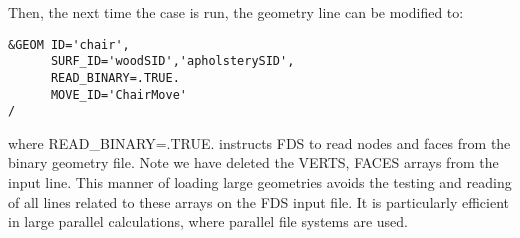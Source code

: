 \documentclass[12pt]{article}
\begin{document}
Then, the next time the case is run, the geometry line can be modified to:
{\small
\begin{verbatim}
&GEOM ID='chair',
      SURF_ID='woodSID','apholsterySID',
      READ_BINARY=.TRUE.
      MOVE_ID='ChairMove'
/
\end{verbatim}
}

where {\ct READ\_BINARY=.TRUE.} instructs FDS to read nodes and faces from the binary geometry file.
Note we have deleted the {\ct VERTS, FACES} arrays from the input line.
This manner of loading large geometries avoids the testing and reading of all lines related to these arrays on the FDS input file.
It is particularly efficient in large parallel calculations, where parallel file systems are used.


%
%
%
%
%
%
%
%
\end{document}
